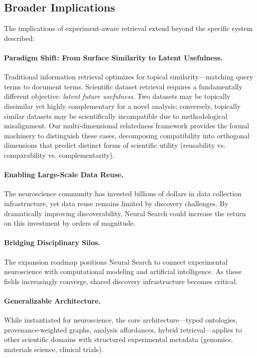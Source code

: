 \documentclass{article}
\theoremstyle{definition}
\begin{document}
\subsection{Broader Implications}

The implications of experiment-aware retrieval extend beyond the specific system described:

\paragraph{Paradigm Shift: From Surface Similarity to Latent Usefulness.} Traditional information retrieval optimizes for topical similarity---matching query terms to document terms. Scientific dataset retrieval requires a fundamentally different objective: \textit{latent future usefulness}. Two datasets may be topically dissimilar yet highly complementary for a novel analysis; conversely, topically similar datasets may be scientifically incompatible due to methodological misalignment. Our multi-dimensional relatedness framework provides the formal machinery to distinguish these cases, decomposing compatibility into orthogonal dimensions that predict distinct forms of scientific utility (reusability vs. comparability vs. complementarity).

\paragraph{Enabling Large-Scale Data Reuse.} The neuroscience community has invested billions of dollars in data collection infrastructure, yet data reuse remains limited by discovery challenges. By dramatically improving discoverability, Neural Search could increase the return on this investment by orders of magnitude.

\paragraph{Bridging Disciplinary Silos.} The expansion roadmap positions Neural Search to connect experimental neuroscience with computational modeling and artificial intelligence. As these fields increasingly converge, shared discovery infrastructure becomes critical.

\paragraph{Generalizable Architecture.} While instantiated for neuroscience, the core architecture---typed ontologies, provenance-weighted graphs, analysis affordances, hybrid retrieval---applies to other scientific domains with structured experimental metadata (genomics, materials science, clinical trials).
\end{document}
